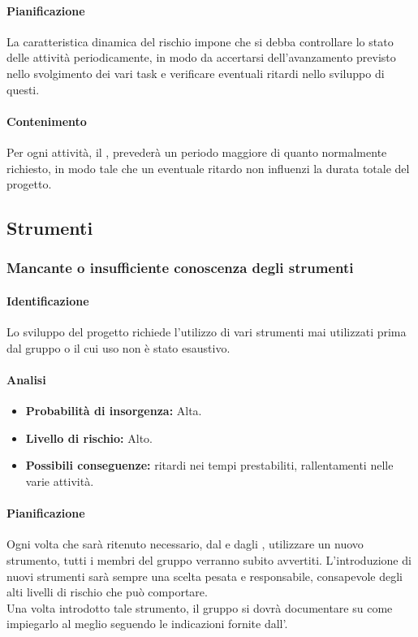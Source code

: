 \paragraph {Pianificazione}
La caratteristica dinamica del rischio impone che si debba controllare lo stato delle attività periodicamente, in modo da accertarsi dell'avanzamento previsto nello svolgimento dei vari task e verificare eventuali ritardi nello sviluppo di questi.

\paragraph {Contenimento}
Per ogni attività, il \RdP{}, prevederà un periodo maggiore di quanto normalmente richiesto, in modo tale che un eventuale ritardo non influenzi la durata totale del progetto.

\subsection{Strumenti}
\subsubsection{Mancante o insufficiente conoscenza degli strumenti}
\paragraph {Identificazione}
Lo sviluppo del progetto richiede l'utilizzo di vari strumenti mai utilizzati prima dal gruppo o il cui uso non è stato esaustivo.

\paragraph{Analisi}
\begin{itemize}
	\item \textbf{Probabilità di insorgenza:} Alta.
	\item \textbf{Livello di rischio:} Alto.
	\item \textbf{Possibili conseguenze:} ritardi nei tempi prestabiliti, rallentamenti nelle varie attività.
\end{itemize}

\paragraph {Pianificazione}

Ogni volta che sarà ritenuto necessario, dal \RdP{} e dagli \adms{}, utilizzare un nuovo strumento, tutti i membri del gruppo verranno subito avvertiti. L'introduzione di nuovi strumenti sarà sempre una scelta pesata e responsabile, consapevole degli alti livelli di rischio che può comportare. \\
Una volta introdotto tale strumento, il gruppo si dovrà documentare su come impiegarlo al meglio seguendo le indicazioni fornite dall’\adm{}.

